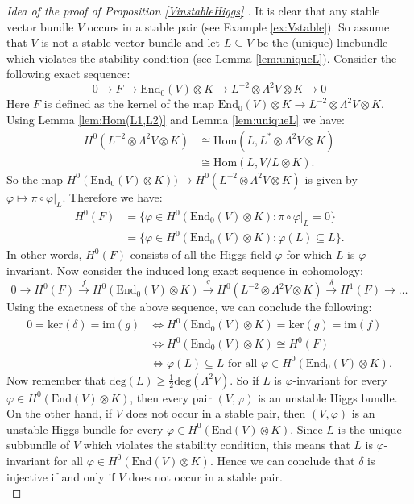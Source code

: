 \begin{proof}[Idea of the proof of Proposition \ref{VinstableHiggs} ]
	It is clear that any stable vector bundle $V$ occurs in a stable pair (see Example \ref{ex:Vstable}). So assume that $V$ is not a stable vector bundle and let $L\subseteq V$ be the (unique) linebundle which violates the stability condition (see Lemma \ref{lem:uniqueL}). Consider the following exact sequence:
	\[
	 0 \rightarrow  F \rightarrow  \mathrm{End} _0 ( V) \otimes K \rightarrow L^{-2} \otimes \Lambda^2V \otimes K \rightarrow  0 
	\]
	Here $F$ is defined as the kernel of the map $\mathrm{End} _0 ( V )\otimes K \rightarrow L^{-2} \otimes \Lambda^2V \otimes K$. Using Lemma \ref{lem:Hom(L1,L2)} and Lemma \ref{lem:uniqueL} we have: 
	\begin{align*}
		H^0(L^{-2}\otimes \Lambda^2V\otimes K) &\cong \mathrm{Hom}(L,L^* \otimes \Lambda^2V\otimes K) \\
		&\cong\mathrm{Hom}(L,V/L \otimes K).
	\end{align*}
	So the map $H^0(\mathrm{End} _0 ( V) \otimes K)) \rightarrow H^0(L^{-2} \otimes \Lambda^2V \otimes K)$ is given by $\varphi \mapsto \pi \circ \varphi|_{L}$. Therefore we have:
	\begin{align*}
	H^0(F) &= \{ \varphi \in H^0(\mathrm{End}_0(V)\otimes K) \colon \pi \circ \varphi|_{L} = 0 \}\\
	&= \{ \varphi \in H^0(\mathrm{End}_0(V)\otimes K) \colon \varphi(L) \subseteq L \}.
	\end{align*}
	In other words, $H^0(F)$ consists of all the Higgs-field $\varphi$ for which $L$ is $\varphi$-invariant. Now consider the induced long exact sequence in cohomology: 
	\[
	 0 \rightarrow  H^0(F) \overset{f}{\rightarrow} H^0(\mathrm{End} _0 ( V) \otimes K) \overset{g}{\rightarrow} H^0(L^{-2} \otimes \Lambda^2V \otimes K ) \overset{\delta}{\rightarrow} H^1(F) \rightarrow \ldots 
	\]
	Using the exactness of the above sequence, we can conclude the following:
	\begin{align*}
		0 = \mathrm{ker}(\delta)= \mathrm{im}(g)
		&\iff H^0(\mathrm{End}_0(V)\otimes K) = \mathrm{ker}(g) = \mathrm{im}(f)\\
		&\iff H^0(\mathrm{End}_0(V)\otimes K) \cong H^0(F)\\
		&\iff \varphi(L)\subseteq L \text{ for all } \varphi \in H^0(\mathrm{End}_0(V)\otimes K).
	\end{align*}
	Now remember that $\mathrm{deg}(L) \geq \frac{1}{2} \mathrm{deg} (\Lambda^2V ) $. So if $L$ is $\varphi$-invariant for every $\varphi \in H^0(\mathrm{End}(V)\otimes K)$, then every pair $(V,\varphi)$ is an unstable Higgs bundle. On the other hand, if $V$ does not occur in a stable pair, then $(V,\varphi)$ is an unstable Higgs bundle for every $\varphi \in H^0(\mathrm{End}(V)\otimes K)$. Since $L$ is the unique subbundle of $V$ which violates the stability condition, this means that $L$ is $\varphi$-invariant for all $\varphi \in H^0(\mathrm{End}(V)\otimes K)$. Hence we can conclude that $\delta$ is injective if and only if $V$ does not occur in a stable pair. \\
	

\end{proof}
